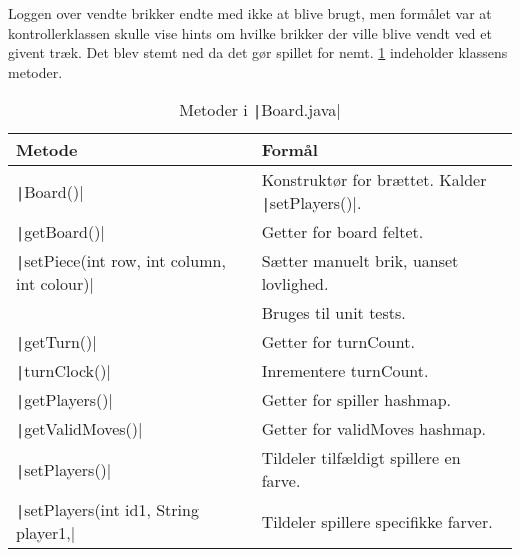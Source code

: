 Loggen over vendte brikker endte med ikke at blive brugt, men formålet var at kontrollerklassen skulle vise hints om hvilke brikker der ville blive vendt ved et givent træk. Det blev stemt ned da det gør spillet for nemt.\newline
\cref{tbl:boardmethods} indeholder klassens metoder.
\begin{table}[H]
    \centering
    \caption{Metoder i \texttt|Board.java|}\label{tbl:boardmethods}
    \begin{tabular}{ll}
        \toprule
        Metode                                                        & Formål                                                                               \\
        \midrule
        \texttt|Board()|                                    & Konstruktør for brættet. Kalder \texttt|setPlayers()|.                     \\
        \texttt|getBoard()|                                 & Getter for board feltet.                                                             \\
        \texttt|setPiece(int row, int column, int colour)|  & Sætter manuelt brik, uanset lovlighed.                                               \\
                                                                      & Bruges til unit tests.                                                               \\
        \texttt|getTurn()|                                  & Getter for turnCount.                                                                \\
        \texttt|turnClock()|                                & Inrementere turnCount.                                                               \\
        \texttt|getPlayers()|                               & Getter for spiller hashmap.                                                          \\
        \texttt|getValidMoves()|                            & Getter for validMoves hashmap.                                                       \\
        \texttt|setPlayers()|                               & Tildeler tilfældigt spillere en farve.                                               \\
        \texttt|setPlayers(int id1, String player1,|        & Tildeler spillere specifikke farver.                                                 \\

\end{tabular}
\end{table}
